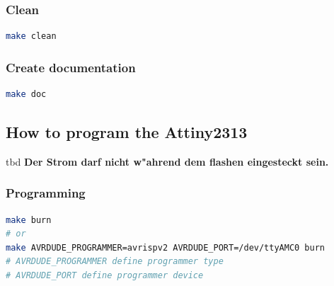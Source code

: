 \subsubsection{Clean}
\begin{lstlisting}[caption={Clean},language=sh,label=lst:makeclean]
make clean
\end{lstlisting}
\vspace{0.5cm}

\subsubsection{Create documentation}
\begin{lstlisting}[caption={Create documentation},language=sh,label=lst:builddoc]
make doc
\end{lstlisting}
\vspace{0.5cm}


\subsection{How to program the Attiny2313}
tbd %
\textbf{Der Strom darf nicht w"ahrend dem flashen eingesteckt sein.}

\subsubsection{Programming}
\begin{lstlisting}[caption={Programming},language=sh,label=lst:builddoc]
make burn
# or
make AVRDUDE_PROGRAMMER=avrispv2 AVRDUDE_PORT=/dev/ttyAMC0 burn
# AVRDUDE_PROGRAMMER define programmer type
# AVRDUDE_PORT define programmer device
\end{lstlisting}
\vspace{0.5cm}



